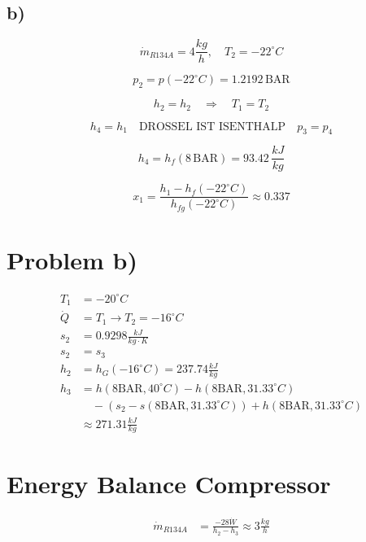 

\subsection*{b)}

\[
\dot{m}_{R134A} = 4 \frac{kg}{h}, \quad T_2 = -22^\circ C
\]

\[
p_2 = p(-22^\circ C) = 1.2192 \, \text{BAR}
\]

\[
h_2 = h_2 \quad \Rightarrow \quad T_1 = T_2
\]

\[
h_4 = h_1 \quad \text{DROSSEL IST ISENTHALP} \quad p_3 = p_4
\]

\[
h_{4} = h_{f} (8 \, \text{BAR}) = 93.42 \, \frac{kJ}{kg}
\]

\[
x_1 = \frac{h_1 - h_f (-22^\circ C)}{h_{fg} (-22^\circ C)} \approx 0.337
\]

\section*{Problem b)}

\begin{align*}
    T_1 &= -20^\circ C \\
    \dot{Q} &= T_1 \rightarrow T_2 = -16^\circ C \\
    s_2 &= 0.9298 \frac{kJ}{kg \cdot K} \\
    s_2 &= s_3 \\
    h_2 &= h_G (-16^\circ C) = 237.74 \frac{kJ}{kg} \\
    h_3 &= h(8 \text{BAR}, 40^\circ C) - h(8 \text{BAR}, 31.33^\circ C) \\
    &\quad - (s_2 - s(8 \text{BAR}, 31.33^\circ C)) + h(8 \text{BAR}, 31.33^\circ C) \\
    &\approx 271.31 \frac{kJ}{kg}
\end{align*}

\section*{Energy Balance Compressor}

\begin{align*}
    \dot{m}_{R134A} &= \frac{-28 \dot{W}}{h_2 - h_3} \approx 3 \frac{kg}{h}
\end{align*}